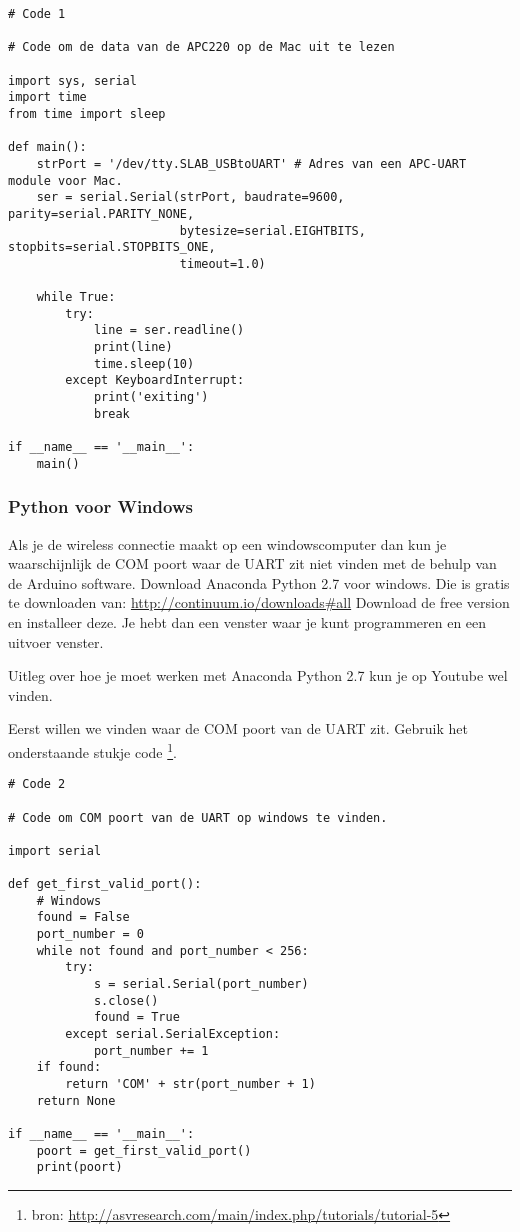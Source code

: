 \begin{verbatim}
# Code 1

# Code om de data van de APC220 op de Mac uit te lezen

import sys, serial
import time
from time import sleep

def main():
    strPort = '/dev/tty.SLAB_USBtoUART' # Adres van een APC-UART module voor Mac.
    ser = serial.Serial(strPort, baudrate=9600, parity=serial.PARITY_NONE,
                        bytesize=serial.EIGHTBITS, stopbits=serial.STOPBITS_ONE,
                        timeout=1.0)

    while True:
        try:
            line = ser.readline()
            print(line)
            time.sleep(10)
        except KeyboardInterrupt:
            print('exiting')
            break

if __name__ == '__main__':
    main()
\end{verbatim}


\subsubsection{Python voor Windows}

Als je de wireless connectie maakt op een windowscomputer dan kun je
waarschijnlijk de COM poort waar de UART zit niet vinden met de behulp van de
Arduino software. Download Anaconda Python 2.7 voor windows.
Die is gratis te downloaden van: \url{http://continuum.io/downloads#all}
Download de free version en installeer deze. Je hebt dan een venster waar je kunt
programmeren en een uitvoer venster.

Uitleg over hoe je moet werken met Anaconda Python 2.7 kun je op Youtube wel vinden.

Eerst willen we vinden waar de COM poort van de UART zit. Gebruik het onderstaande
stukje code \footnote{bron: \url{http://asvresearch.com/main/index.php/tutorials/tutorial-5}}.

\begin{verbatim}
# Code 2

# Code om COM poort van de UART op windows te vinden.

import serial

def get_first_valid_port():
    # Windows
    found = False
    port_number = 0
    while not found and port_number < 256:
        try:
            s = serial.Serial(port_number)
            s.close()
            found = True
        except serial.SerialException:
            port_number += 1
    if found:
        return 'COM' + str(port_number + 1)
    return None

if __name__ == '__main__':
    poort = get_first_valid_port()
    print(poort)
\end{verbatim}

